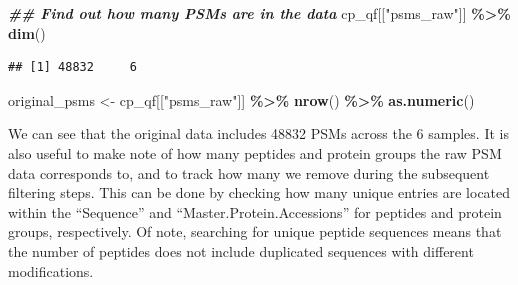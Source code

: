 \documentclass[9pt,a4paper,]{extarticle}
\newenvironment{Shaded}{\begin{snugshade}}{\end{snugshade}}
\newcommand{\DocumentationTok}[1]{\textcolor[rgb]{0.56,0.35,0.01}{\textbf{\textit{#1}}}}
\newcommand{\FunctionTok}[1]{\textcolor[rgb]{0.13,0.29,0.53}{\textbf{#1}}}
\newcommand{\NormalTok}[1]{#1}
\newcommand{\OtherTok}[1]{\textcolor[rgb]{0.56,0.35,0.01}{#1}}
\newcommand{\SpecialCharTok}[1]{\textcolor[rgb]{0.81,0.36,0.00}{\textbf{#1}}}
\newcommand{\StringTok}[1]{\textcolor[rgb]{0.31,0.60,0.02}{#1}}
\begin{document}
\begin{Shaded}
\begin{Highlighting}[]
\DocumentationTok{\#\# Find out how many PSMs are in the data}
\NormalTok{cp\_qf[[}\StringTok{"psms\_raw"}\NormalTok{]] }\SpecialCharTok{\%\textgreater{}\%}
  \FunctionTok{dim}\NormalTok{()}
\end{Highlighting}
\end{Shaded}

\begin{verbatim}
## [1] 48832     6
\end{verbatim}

\begin{Shaded}
\begin{Highlighting}[]
\NormalTok{original\_psms }\OtherTok{\textless{}{-}}\NormalTok{ cp\_qf[[}\StringTok{"psms\_raw"}\NormalTok{]] }\SpecialCharTok{\%\textgreater{}\%}
  \FunctionTok{nrow}\NormalTok{() }\SpecialCharTok{\%\textgreater{}\%}
  \FunctionTok{as.numeric}\NormalTok{()}
\end{Highlighting}
\end{Shaded}

We can see that the original data includes 48832 PSMs
across the 6 samples. It is also useful to make note of how many peptides and
protein groups the raw PSM data corresponds to, and to track how many we remove during
the subsequent filtering steps. This can be done by checking how many unique entries
are located within the ``Sequence'' and ``Master.Protein.Accessions'' for peptides
and protein groups, respectively. Of note, searching for unique peptide sequences means
that the number of peptides does not include duplicated sequences with different
modifications.
\end{document}

